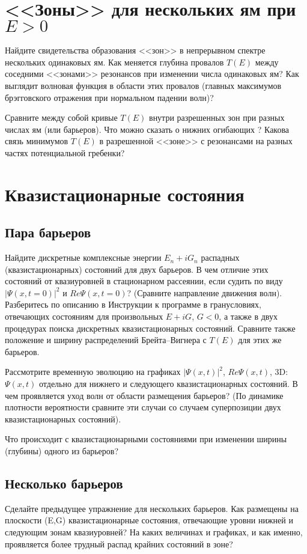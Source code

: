 \documentclass[12pt]{article}
\begin{document}
\hypertarget{band_N_well_positive_E}{}\section[Зоны для
нескольких ям при положительных энергиях]{<<Зоны>> для нескольких
ям при $E>0$}
Найдите свидетельства образования <<зон>> в непрерывном спектре
нескольких одинаковых ям. Как меняется глубина провалов $T(E)$
между соседними <<зонами>> резонансов  при изменении числа
одинаковых ям? Как выглядит волновая  функция в области этих
провалов (главных максимумов брэгговского отражения при
нормальном падении волн)?

Сравните между собой кривые $T(E)$ внутри разрешенных зон при
разных числах ям (или барьеров). Что  можно сказать  о нижних
огибающих ?  Какова связь минимумов $T(E)$ в разрешенной <<зоне>> с
резонансами на разных частях потенциальной гребенки?

\hypertarget{quasistacionary_state}{}\section{Квазистационарные
состояния}
\hypertarget{quasistacionary_state_two_barrier}{}\subsection{Пара
барьеров}
Найдите дискретные комплексные энергии $E_n+iG_n$ распадных
(квазистационарных) состояний для двух барьеров. В чем  отличие
этих состояний от квазиуровней в стационарном
рассеянии, если судить по виду $|\Psi(x,t=0)|^2$ и $Re
\Psi(x,t=0)$? (Сравните направление движения волн). Разберитесь
по описанию в  Инструкции к программе в гранусловиях,
отвечающих состояниям для произвольных $E+iG$, $G<0$, а также
в двух процедурах поиска дискретных квазистационарных
состояний. Сравните также положение и ширину распределений
Брейта--Вигнера с $T(E)$ для этих же барьеров.

Рассмотрите временную эволюцию на графиках $|\Psi(x,t)|^2$, $Re
\Psi(x,t)$, 3D:$\Psi(x,t)$ отдельно для нижнего и следующего
квазистационарных состояний. В чем проявляется уход волн от
области размещения барьеров? (По динамике плотности вероятности
сравните эти случаи со случаем суперпозиции двух
квазистационарных состояний).

Что происходит с квазистационарными состояниями при изменении
ширины (глубины) одного из барьеров?

\hypertarget{quasistacionary_state_N_barrier}
{}\subsection{Несколько барьеров}
Сделайте предыдущее упражнение для нескольких барьеров.
Как размещены на плоскости (E,G) квазистационарные состояния,
отвечающие уровни нижней и следующим зонам квазиуровней?
На каких величинах и графиках, и как именно, проявляется более
трудный распад крайних состояний в зоне?
\end{document}
